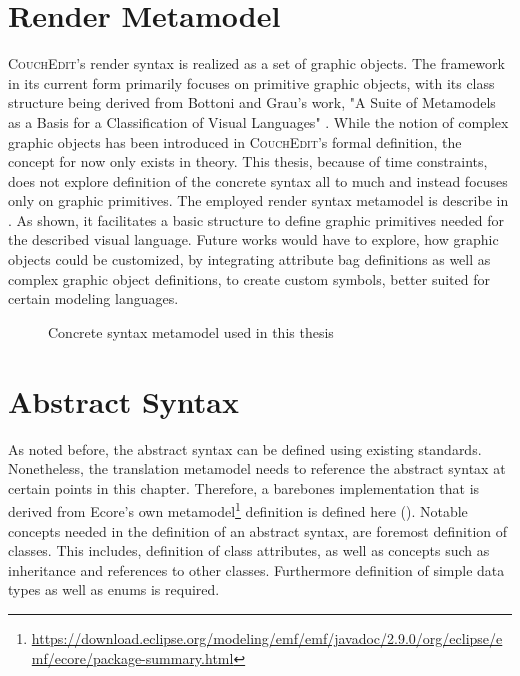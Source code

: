 \section{Render Metamodel}
\textsc{CouchEdit}'s render syntax is realized as a set of graphic objects. The framework in its current form primarily focuses on primitive graphic objects, with its class structure being derived \cite[p.39]{nachreiner_couchedit_2020} from Bottoni and Grau's work, "A Suite of Metamodels as a Basis for a Classification of Visual Languages" \cite{bottoni_suite_2004}. While the notion of complex graphic objects has been introduced in \textsc{CouchEdit}'s formal definition, the concept for now only exists in theory. This thesis, because of time constraints, does not explore definition of the concrete syntax all to much and instead focuses only on graphic primitives. The employed render syntax metamodel is describe in . As shown, it facilitates a basic structure to define graphic primitives needed for the described visual language. Future works would have to explore, how graphic objects could be customized, by integrating attribute bag definitions as well as complex graphic object definitions, to create custom symbols, better suited for certain modeling languages.

\begin{figure}
  \centering
  
  \caption{Concrete syntax metamodel used in this thesis}
  \label{fig:concretesyntax}
\end{figure}


\section{Abstract Syntax}
\label{sec:abstract-syntax}
As noted before, the abstract syntax can be defined using existing standards. Nonetheless, the translation metamodel needs to reference the abstract syntax at certain points in this chapter. Therefore, a barebones implementation that is derived from Ecore's own metamodel\footnote{\url{https://download.eclipse.org/modeling/emf/emf/javadoc/2.9.0/org/eclipse/emf/ecore/package-summary.html}} definition is defined here (). Notable concepts needed in the definition of an abstract syntax, are foremost definition of classes. This includes, definition of class attributes, as well as concepts such as inheritance and references to other classes. Furthermore definition of simple data types as well as enums is required.

